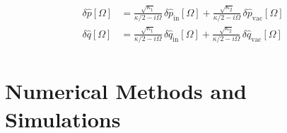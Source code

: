 \begin{equation}
\begin{split}
  \delta \hat{p}[\Omega] &=  \frac{\sqrt{\kappa_1}}{\kappa/2-i\Omega} \, \delta \hat{p}_{\mathrm{in}}[\Omega] + \frac{\sqrt{\kappa_2}}{\kappa/2-i\Omega} \, \delta \hat{p}_{\mathrm{vac}}[\Omega] \\
  \delta \hat{q}[\Omega] &=  \frac{\sqrt{\kappa_1}}{\kappa/2-i\Omega} \, \delta \hat{q}_{\mathrm{in}}[\Omega] + \frac{\sqrt{\kappa_2}}{\kappa/2-i\Omega} \, \delta \hat{q}_{\mathrm{vac}}[\Omega] \\
\end{split}
\end{equation}
\section{Numerical Methods and Simulations}

